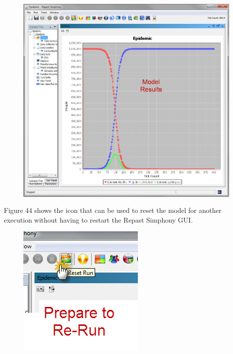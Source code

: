 \documentclass[11pt]{amsart}
\begin{document}
\begin{figure}[ht]
\begin{center}
\vspace{.2in}
\centerline {
\includegraphics[totalheight=0.5\textheight]{images/043.jpg}
}
\caption{}
\label{fig:043}
\end{center}
\end{figure}

Figure 44 shows the icon that can be used to reset the model for another execution without having to restart the Repast Simphony GUI.


\begin{figure}[ht]
\begin{center}
\vspace{.2in}
\centerline {
\includegraphics[totalheight=0.2\textheight]{images/044.jpg}
}
\caption{}
\label{fig:044}
\end{center}
\end{figure}
\end{document}

